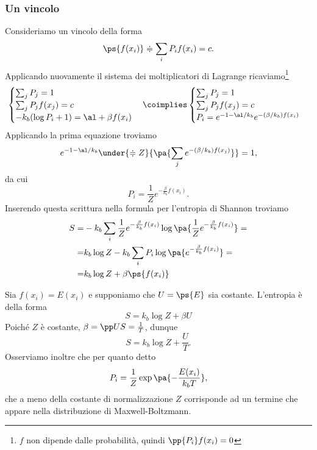 \subsubsection{Un vincolo}
Consideriamo un vincolo della forma 
\[\ps{f(x_i)}\doteqdot\sum_i P_i f(x_i)=c.\]
Applicando nuovamente il sistema dei moltiplicatori di Lagrange ricaviamo\footnote{$f$ non dipende dalle probabilit\`a, quindi $\pp{P_i}f(x_i)=0$}
\[\begin{cases}
\sum_j P_j=1\\
\sum_j P_j f(x_j)=c\\
-k_b (\log P_i+1)=\al+\beta f(x_i)
\end{cases}\coimplies \begin{cases}
\sum_j P_j=1\\
\sum_j P_j f(x_j)=c\\
P_i=e^{-1-\al/k_b}e^{-(\beta/k_b) f(x_i)}
\end{cases}\]
Applicando la prima equazione troviamo
\[e^{-1-\al/k_b}\under{\doteqdot Z}{\pa{\sum_j e^{-(\beta/k_b)f(x_j)}}}=1,\]
da cui
\[P_i=\frac1Ze^{-\frac\beta{k_b}f(x_i)}.\]
Inserendo questa scrittura nella formula per l'entropia di Shannon troviamo
\begin{align*}
S=&-k_b\sum_i \frac1Ze^{-\frac\beta{k_b}f(x_i)}\log\pa{\frac1Ze^{-\frac\beta{k_b}f(x_i)}}=\\
=&k_b\log Z-k_b\sum_i P_i\log\pa{e^{-\frac\beta{k_b}f(x_i)}}=\\
=&k_b\log Z+\beta\ps{f(x_i)} 
\end{align*}

\begin{example}
Sia $f(x_i)=E(x_i)$ e supponiamo che $U=\ps{E}$ sia costante. L'entropia \`e della forma
\[S=k_b\log Z+\beta U\]
Poich\'e $Z$ \`e costante, $\beta=\pp US=\frac1T$, dunque
\[S=k_b\log Z+\frac UT.\]
Osserviamo inoltre che per quanto detto
\[P_i=\frac1Z \exp\pa{-\dfrac{E(x_i)}{k_bT}},\]
che a meno della costante di normalizzazione $Z$ corrisponde ad un termine che appare nella distribuzione di Maxwell-Boltzmann.
\end{example}